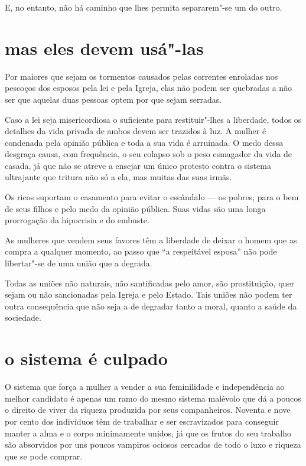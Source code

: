 E, no entanto, não há caminho que lhes permita separarem"-se um do outro.

\section{mas eles devem usá"-las}

Por maiores que sejam os tormentos causados pelas correntes
enroladas nos pescoços dos esposos pela lei e pela Igreja, elas não podem ser quebradas
a não ser que aquelas duas pessoas optem por que sejam serradas.

Caso a lei seja misericordiosa o suficiente para restituir"-lhes a liberdade,
todos os detalhes da vida privada de ambos devem ser
trazidos à luz. A mulher é condenada pela opinião pública e toda a sua
vida é arruinada. O medo dessa desgraça causa, com frequência, o
seu colapso sob o peso esmagador da vida de casada, já que não se atreve
a ensejar um único protesto contra o sistema ultrajante que tritura não
só a ela, mas muitas das suas irmãs.

Os ricos suportam o casamento para evitar o escândalo --- os pobres, para
o bem de seus filhos e pelo medo da opinião pública. Suas vidas são uma
longa prorrogação da hipocrisia e do embuste.

As mulheres que vendem seus favores têm a liberdade de deixar o homem
que as compra a qualquer momento, ao passo que ``a respeitável esposa''
não pode libertar"-se de uma união que a degrada.

Todas as uniões não naturais, não santificadas pelo amor, são
prostituição, quer sejam ou não sancionadas pela Igreja e pelo Estado.
Tais uniões não podem ter outra consequência que não seja a de degradar
tanto a moral, quanto a saúde da sociedade.

\section{o sistema é culpado}

O sistema que força a mulher a vender a sua feminilidade e independência\label{sistema}
ao melhor candidato é apenas um ramo do mesmo sistema malévolo que dá a poucos
o direito de viver da riqueza produzida por seus companheiros. Noventa e
nove por cento dos indivíduos têm de trabalhar e ser escravizados para
conseguir manter a alma e o corpo minimamente unidos, já que os frutos
do seu trabalho são absorvidos por uns poucos vampiros ociosos cercados
de todo o luxo e riqueza que se pode comprar.

